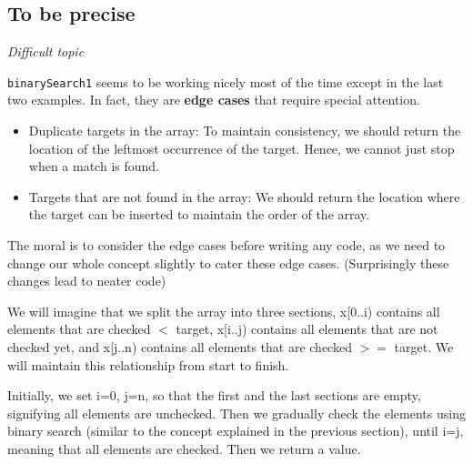 \pagebreak

\subsection*{To be precise}

\textit{Difficult topic}
\vspace{6mm}

\texttt{binarySearch1} seems to be working nicely most of the time except in the last two examples. In fact, they are \textbf{edge cases} that require special attention. 

\begin{itemize}
    \item Duplicate targets in the array: To maintain consistency, we should return the location of the leftmost occurrence of the target. Hence, we cannot just stop when a match is found.
    \item Targets that are not found in the array: We should return the location where the target can be inserted to maintain the order of the array. 
\end{itemize}



The moral is to consider the edge cases before writing any code, as we need to change our whole concept slightly to cater these edge cases. (Surprisingly these changes lead to neater code)
\vspace{6mm}

We will imagine that we split the array into three sections, x[0..i) contains all elements that are checked $<$ target, x[i..j) contains all elements that are not checked yet, and x[j..n) contains all elements that are checked $>=$ target. We will maintain this relationship from start to finish. 

Initially, we set i=0, j=n, so that the first and the last sections are empty, signifying all elements are unchecked. Then we gradually check the elements using binary search (similar to the concept explained in the previous section), until i=j, meaning that all elements are checked. Then we return a value.
\vspace{6mm}

